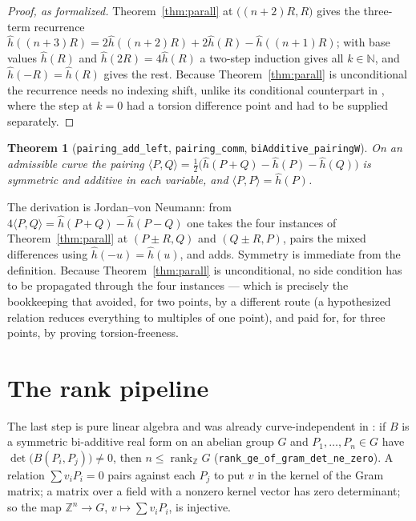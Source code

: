 \documentclass[11pt,reqno]{amsart}
\theoremstyle{plain}
\newtheorem{theorem}{Theorem}[section]
\theoremstyle{definition}
\theoremstyle{remark}
\DeclareRobustCommand{\lt}[1]{\texttt{#1}}
\newcommand{\hh}{\widehat{h}}
\DeclareMathOperator{\rank}{rank}
\begin{document}
\begin{proof}[Proof, as formalized]
Theorem~\ref{thm:parall} at $\bigl((n{+}2)R, R\bigr)$ gives the
three-term recurrence
$\hh((n{+}3)R) = 2\hh((n{+}2)R) + 2\hh(R) - \hh((n{+}1)R)$; with base
values $\hh(R)$ and $\hh(2R) = 4\hh(R)$ a two-step induction gives all
$k \in \mathbb{N}$, and $\hh(-R) = \hh(R)$ gives the rest. Because
Theorem~\ref{thm:parall} is unconditional the recurrence needs no
indexing shift, unlike its conditional counterpart in \cite{MW}, where
the step at $k=0$ had a torsion difference point and had to be supplied
separately.
\end{proof}

\begin{theorem}[\lt{pairing\_add\_left}, \lt{pairing\_comm},
\lt{biAdditive\_pairingW}]\label{thm:biadd}
On an admissible curve the pairing
$\langle P,Q\rangle = \tfrac12\bigl(\hh(P{+}Q) - \hh(P) -
\hh(Q)\bigr)$ is symmetric and additive in each variable, and
$\langle P,P\rangle = \hh(P)$.
\end{theorem}

The derivation is Jordan--von Neumann: from
$4\langle P,Q\rangle = \hh(P{+}Q) - \hh(P{-}Q)$ one takes the four
instances of Theorem~\ref{thm:parall} at $(P{\pm}R, Q)$ and
$(Q{\pm}R, P)$, pairs the mixed differences using $\hh(-u) = \hh(u)$,
and adds. Symmetry is immediate from the definition. Because
Theorem~\ref{thm:parall} is unconditional, no side condition has to be
propagated through the four instances --- which is precisely the
bookkeeping that \cite{MW} avoided, for two points, by a different route
(a hypothesized relation reduces everything to multiples of one point),
and paid for, for three points, by proving torsion-freeness.

\section{The rank pipeline}\label{sec:pipeline}

The last step is pure linear algebra and was already curve-independent
in \cite{MW}: if $B$ is a symmetric bi-additive real form on an abelian
group $G$ and $P_1,\dots,P_n \in G$ have
$\det\bigl(B(P_i,P_j)\bigr) \ne 0$, then
$n \le \rank_{\mathbb{Z}} G$ (\lt{rank\_ge\_of\_gram\_det\_ne\_zero}). A
relation $\sum v_iP_i = 0$ pairs against each $P_j$ to put $v$ in the
kernel of the Gram matrix; a matrix over a field with a nonzero kernel
vector has zero determinant; so the map
$\mathbb{Z}^n \to G$, $v \mapsto \sum v_iP_i$, is injective.
\end{document}

